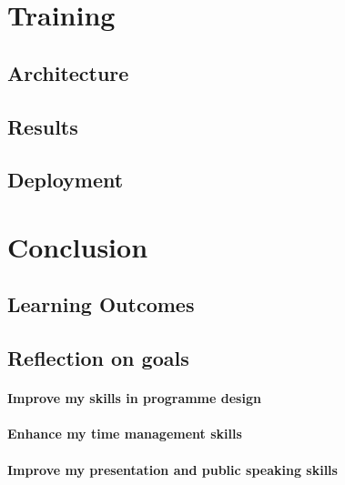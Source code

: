 \section{Training}
    \subsection{Architecture}
    \subsection{Results}
    \subsection{Deployment}

\section{Conclusion}
    \subsection{Learning Outcomes}
    \subsection{Reflection on goals}
        \paragraph{Improve my skills in programme design}  
        \paragraph{Enhance my time management skills}
        \paragraph{Improve my presentation and public speaking skills}